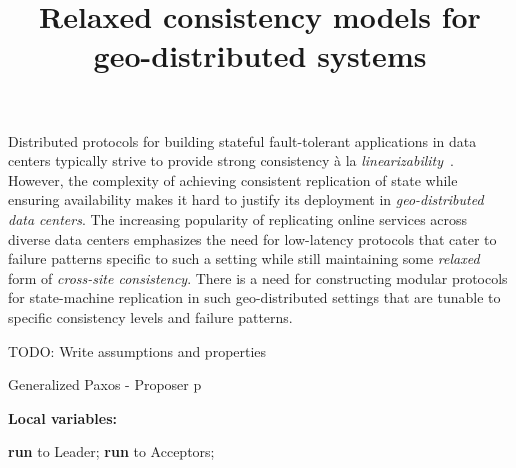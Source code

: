 \documentclass[10pt,pdftex,a4paper]{article}%
\begin{document}


\title{Relaxed consistency models for geo-distributed systems}
\date{}
\maketitle
%
%
\begin{abstract}
%
\end{abstract}
%
Distributed protocols for building stateful fault-tolerant applications in data centers typically strive to provide strong consistency \`a la \emph{linearizability}~\cite{Her91}.
However, the complexity of achieving consistent replication of state while ensuring availability makes it hard to justify its deployment in \emph{geo-distributed data centers}.
The increasing popularity of replicating online services across diverse data centers emphasizes 
the need for low-latency protocols that cater to failure patterns specific to such a setting while still maintaining 
some \emph{relaxed} form of \emph{cross-site consistency}. There is a need for constructing modular protocols for state-machine replication
in such geo-distributed settings that are tunable to specific consistency levels and failure patterns.
%
\par 
{\color{red} TODO: Write assumptions and properties}

\begin{algorithm}
\caption{Generalized Paxos - Proposer p}
\textbf{Local variables:}
\begin{algorithmic}[1]
    
            \State \textbf{run}  to Leader;
        \Else
            \State \textbf{run}  to Acceptors;
        \EndIf
    \EndFunction    
    
\end{algorithmic}
\end{algorithm}
\end{document}
